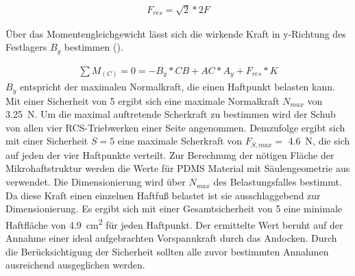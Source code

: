 	\begin{eqnarray}
			F_{res}=\sqrt{ 2 }*2F
	\end{eqnarray}

	Über das Momentengleichgewicht lässt sich die wirkende Kraft in y-Richtung des Festlagers $B_y$  bestimmen ().

\begin{eqnarray}
		\sum{  }{  }{ M_{(C)} }=0=-B_y*CB+AC*A_y+F_{res}*K
\end{eqnarray}
$B_y$ entspricht der maximalen Normalkraft, die einen Haftpunkt belasten kann. Mit einer Sicherheit von \num{5} ergibt sich eine maximale Normalkraft $N_{max}$ von \SI{3,25}{\newton}. Um die maximal auftretende Scherkraft zu bestimmen wird der Schub von allen vier RCS-Triebwerken einer Seite angenommen. Demzufolge ergibt sich mit einer Sicherheit $S = 5$ eine maximale Scherkraft von $F_{S, max} =$ \SI{4,6}{\newton}, die sich auf jeden der vier Haftpunkte verteilt. Zur Berechnung der nötigen Fläche der Mikrohaftstruktur werden die Werte für PDMS Material mit Säulengeometrie aus \cite[Tabelle1, Seite 23]{Schwerter.} verwendet. Die Dimensionierung wird über $N_{max}$ des Belastungsfalles bestimmt. Da diese Kraft einen einzelnen Haftfuß belastet ist sie ausschlaggebend zur Dimensionierung. Es ergibt sich mit einer Gesamtsicherheit von \num{5} eine minimale Haftfläche von \SI{4,9}{\centi\metre\squared} für jeden Haftpunkt. Der ermittelte Wert beruht auf der Annahme einer ideal aufgebrachten Vorspannkraft durch das Andocken. Durch die Berücksichtigung der Sicherheit sollten alle zuvor bestimmten Annahmen ausreichend ausgeglichen werden. 




		

